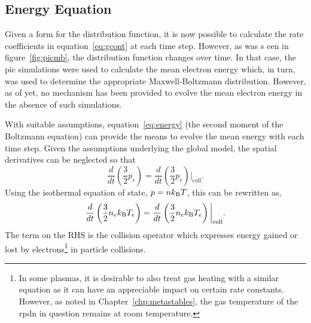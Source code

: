 \subsection{Energy Equation}

Given a form for the distribution function, it is now possible to calculate the
rate coefficients in equation~\ref{eq:gcont} at each time step. However, as was
s een in figure~\ref{fig:picmb}, the distribution function changes over time. In
that case, the \acs{pic} simulations were used to calculate the mean electron
energy which, in turn, was used to determine the appropriate Maxwell-Boltzmann
distribution. However, as of yet, no mechanism has been provided to evolve the
mean electron energy in the absence of such simulations.

With suitable assumptions, equation~\ref{eq:energy} (the second moment of the
Boltzmann equation) can provide the means to evolve the mean energy with each
time step. Given the assumptions underlying the global model, the spatial
derivatives can be neglected so that
\begin{equation}
  \frac{d}{dt}\left(\frac{3}{2}p_e\right) =
  \frac{d}{dt}\left(\frac{3}{2}p_e\right)\bigg|_\mathrm{coll}.
\end{equation}
Using the isothermal equation of state, $p=nk_\mathrm{B} T$, this can be rewritten as,
\begin{equation}
  \frac{d}{dt}\left(\frac{3}{2}n_ek_\mathrm{B} T_e \right) =
  \frac{d}{dt}\left(\frac{3}{2}n_ek_\mathrm{B} T_e \right)\bigg|_\mathrm{coll}.
  \label{eq:energy2}
\end{equation}
The term on the RHS is the collision operator which expresses energy gained or
lost by electrons\footnote{In some plasmas, it is desirable to also treat gas
heating with a similar equation as it can have an appreciable impact on certain
rate constants. However, as noted in Chapter~\ref{chp:metastables}, the gas
temperature of the \acs{rpdn} in question remains at room temperature.} in
particle collisions.

